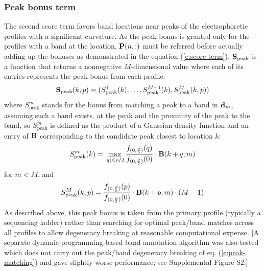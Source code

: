 \subsubsection{Peak bonus term}\label{sss:peak_bonus_term}
The second score term favors band locations near peaks of the electrophoretic profiles with a significant curvature. As the peak bonus is granted only for the profiles with a band at the location, ${\mathbf{P}}(n,:)$ must be referred before actually adding up the bonuses as demonstrated in the equation (\ref{e:score-term}).
$\bold{S}_{\textrm{peak}}$ is a function that returns a nonnegative $M$-dimensional value where each of its entries represents the peak bonus from each profile:
%
\begin{equation}
\bold{S}_{\textrm{peak}}(k,p) = (S^1_{\textrm{peak}}(k), \ldots, S^{M-1}_{\textrm{peak}}(k), S^M_{\textrm{peak}}(k,p))
\end{equation}
%
where $S^m_{\textrm{peak}}$ stands for the bonus from matching a peak to a band in ${\mathbf{d}}_m$, assuming such a band exists.  at the peak and the proximity of the peak to the band, so $S^m_{\textrm{peak}}$ is defined as the product of a Gaussian density function and an entry of ${\mathbf{B}}$ corresponding to the candidate peak closest to location $k$:
%
\begin{equation}
S^m_{\textrm{peak}}(k) = \max_{\substack{|q| < \rho/2}} {{f_{(0, {\rho \over 5})}(q)} \over {f_{(0, {\rho \over 5})}(0)}} \cdot {\mathbf{B}}(k+q, m)
\end{equation}
%
for $m < M$, and
%
\begin{equation}\label{e:peak-matching}
S^M_{\textrm{peak}}(k,p) = {{f_{(0, {\rho \over 5})}(p)} \over {f_{(0, {\rho \over 5})}(0)}} \cdot {\mathbf{B}}(k+p, m) \cdot (M-1)
\end{equation}
%
As described above, this peak bonus is taken from the primary profile (typically a sequencing ladder) rather than searching for optimal peak/band matches across all profiles to allow degeneracy breaking at reasonable computational expense. [A separate dynamic-programming-based band annotation algorithm was also tested which does not carry out the peak/band degeneracy breaking of eq. (\ref{e:peak-matching}) and gave slightly worse performance; see Supplemental Figure S2.]


